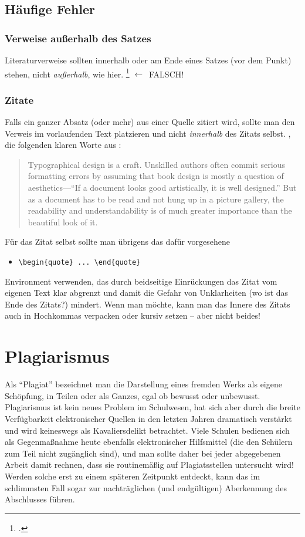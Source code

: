 \subsection{Häufige Fehler}

\subsubsection{Verweise außerhalb des Satzes}
Literaturverweise sollten innerhalb oder am Ende eines Satzes (vor
dem Punkt) stehen, nicht \emph{außerhalb}, wie
hier. \footcite[siehe][]{Oetiker01} $\leftarrow$~FALSCH!

\subsubsection{Zitate}
Falls ein ganzer Absatz (oder mehr) aus einer Quelle zitiert wird,
sollte man den Verweis im vorlaufenden Text platzieren und nicht
\emph{innerhalb} des Zitats selbst. \ZB, die folgenden klaren Worte
aus :
\begin{quote}
Typographical design is a craft. Unskilled authors often commit
serious formatting errors by assuming that book design is mostly a
question of aesthetics---``If a document looks good artistically,
it is well designed.'' But as a document has to be read and not
hung up in a picture gallery, the readability and
understandability is of much greater importance than the beautiful
look of it.
\end{quote}
Für das Zitat selbst sollte man übrigens das dafür vorgesehene
%
\begin{itemize}
 \item[] \verb!\begin{quote} ... \end{quote}!
\end{itemize}
%
Environment verwenden, das durch beidseitige Einrückungen das
Zitat vom eigenen Text klar abgrenzt und damit die Gefahr von
Unklarheiten (wo ist das Ende des Zitats?) mindert.
Wenn man möchte, kann man das Innere des Zitats auch in Hochkommas verpacken oder kursiv setzen -- aber nicht beides!


\section{Plagiarismus}

Als "`Plagiat"' bezeichnet man die Darstellung eines fremden Werks als eigene Schöpfung, 
in Teilen oder als Ganzes, egal ob bewusst oder unbewusst.
Plagiarismus ist kein neues Problem im Schulwesen, hat sich aber durch die 
breite Verfügbarkeit elektronischer Quellen in den letzten Jahren dramatisch 
verstärkt und wird keineswegs als Kavaliersdelikt betrachtet.
Viele Schulen bedienen sich als Gegenmaßnahme heute ebenfalls elektronischer Hilfsmittel 
(die den Schülern zum Teil nicht zugänglich sind), und man sollte daher bei
jeder abgegebenen Arbeit damit rechnen, dass sie routinemäßig auf Plagiatsstellen untersucht wird!
Werden solche erst zu einem späteren Zeitpunkt entdeckt, kann das im schlimmsten Fall sogar 
zur nachträglichen (und endgültigen) Aberkennung des Abschlusses führen.

